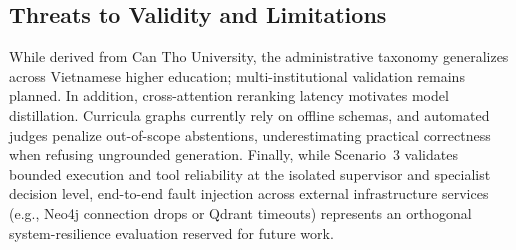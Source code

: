 \subsection{Threats to Validity and Limitations}
\label{sec:limitations}

While derived from Can Tho University, the administrative taxonomy generalizes across Vietnamese higher education; multi-institutional validation remains planned. In addition, cross-attention reranking latency motivates model distillation. Curricula graphs currently rely on offline schemas, and automated judges penalize out-of-scope abstentions, underestimating practical correctness when refusing ungrounded generation. Finally, while Scenario~3 validates bounded execution and tool reliability at the isolated supervisor and specialist decision level, end-to-end fault injection across external infrastructure services (e.g., Neo4j connection drops or Qdrant timeouts) represents an orthogonal system-resilience evaluation reserved for future work.
